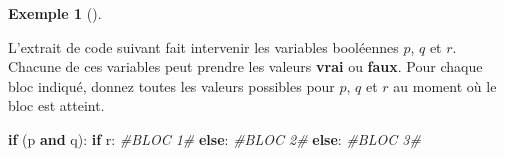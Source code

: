 \documentclass[
  letterpaper,
]{scrbook}
\newenvironment{Shaded}{}{}
\newcommand{\CommentTok}[1]{\textcolor[rgb]{0.38,0.63,0.69}{\textit{#1}}}
\newcommand{\ControlFlowTok}[1]{\textcolor[rgb]{0.00,0.44,0.13}{\textbf{#1}}}
\newcommand{\KeywordTok}[1]{\textcolor[rgb]{0.00,0.44,0.13}{\textbf{#1}}}
\newcommand{\NormalTok}[1]{#1}
\theoremstyle{definition}
\newtheorem{example}{Exemple}[chapter]
\theoremstyle{definition}
\theoremstyle{plain}
\theoremstyle{remark}
\begin{document}
\leavevmode{}%
\begin{example}[]\label{exm-bloc-code}

L'extrait de code suivant fait intervenir les variables booléennes
\(p\), \(q\) et \(r\). Chacune de ces variables peut prendre les valeurs
\textbf{vrai} ou \textbf{faux}. Pour chaque bloc indiqué, donnez toutes
les valeurs possibles pour \(p\), \(q\) et \(r\) au moment où le bloc
est atteint.

\hypertarget{bloc-code-python}{}
\begin{Shaded}
\begin{Highlighting}[]
\ControlFlowTok{if}\NormalTok{ (p }\KeywordTok{and}\NormalTok{ q):}
    \ControlFlowTok{if}\NormalTok{ r:}
        \CommentTok{\#BLOC 1\#}
    \ControlFlowTok{else}\NormalTok{:}
        \CommentTok{\#BLOC 2\#}
\ControlFlowTok{else}\NormalTok{:}
    \CommentTok{\#BLOC 3\#}
\end{Highlighting}
\end{Shaded}


\end{example}
\end{document}
